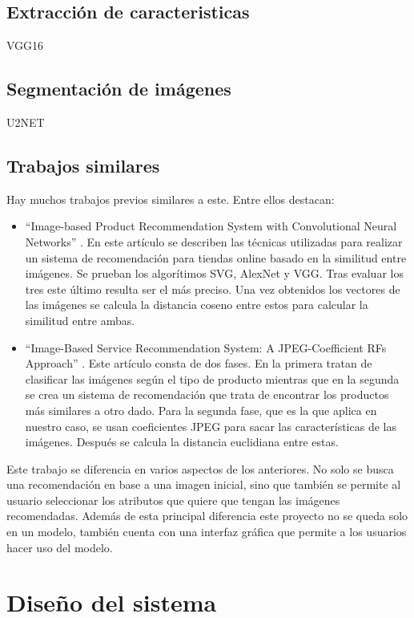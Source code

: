 \documentclass[12pt]{report} %
\begin{document}
	\section{Extracción de caracteristicas}
	VGG16
	\section{Segmentación de imágenes}
	U2NET
	\section{Trabajos similares}
	Hay muchos trabajos previos similares a este. Entre ellos destacan:
	\begin{itemize}
		\item ``Image-based Product Recommendation System with Convolutional Neural
		Networks'' \cite{stanford-paper}. En este artículo se describen las técnicas utilizadas para realizar un sistema de recomendación
		para tiendas online basado en la similitud entre imágenes. Se prueban los algorítimos SVG, AlexNet y VGG. Tras evaluar los tres
		este último resulta ser el más preciso. Una vez obtenidos los vectores de las imágenes se calcula la distancia coseno entre estos
		para calcular la similitud entre ambas.
		\item ``Image-Based Service Recommendation System: A JPEG-Coefficient RFs Approach'' \cite{image-based-paper}. 
		Este artículo consta de dos fases. En la primera tratan de clasificar las imágenes según el tipo de producto mientras 
		que en la segunda se crea un sistema de recomendación que trata de encontrar los productos más similares a otro dado. 
		Para la segunda fase, que es la que aplica en nuestro caso, se usan coeficientes JPEG para sacar las 
		características de las imágenes. Después se calcula la distancia euclidiana entre estas.
	\end{itemize}

	Este trabajo se diferencia en varios aspectos de los anteriores. No solo se busca una recomendación en base a una imagen inicial,
	sino que también se permite al usuario seleccionar los atributos que quiere que tengan las imágenes recomendadas. Además de esta
	principal diferencia este proyecto no se queda solo en un modelo, también
	cuenta con una interfaz gráfica que permite a los usuarios hacer uso del modelo.

	\chapter{Diseño del sistema}
\end{document}
